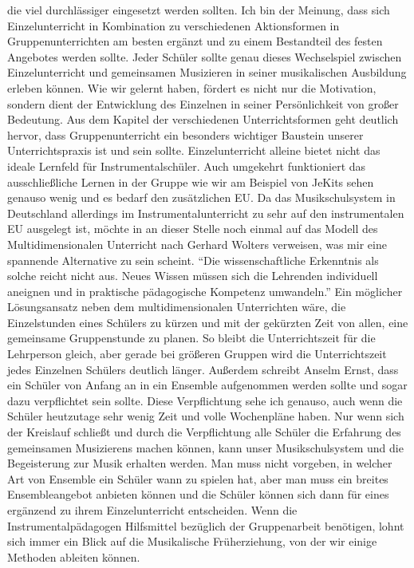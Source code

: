 die viel durchlässiger eingesetzt werden sollten. Ich bin der Meinung, dass sich
Einzelunterricht in Kombination zu verschiedenen Aktionsformen in
Gruppenunterrichten am besten ergänzt und zu einem Bestandteil des festen
Angebotes werden sollte. Jeder Schüler sollte genau dieses Wechselspiel zwischen
Einzelunterricht und gemeinsamen Musizieren in seiner musikalischen Ausbildung
erleben können. Wie wir gelernt haben, fördert es nicht nur die Motivation,
sondern dient der Entwicklung des Einzelnen in seiner Persönlichkeit von großer
Bedeutung. Aus dem Kapitel der verschiedenen Unterrichtsformen geht deutlich
hervor, dass Gruppenunterricht ein besonders wichtiger Baustein unserer
Unterrichtspraxis ist und sein sollte. Einzelunterricht alleine bietet nicht das
ideale Lernfeld für Instrumentalschüler. Auch umgekehrt funktioniert das
ausschließliche Lernen in der Gruppe wie wir am Beispiel von JeKits sehen
genauso wenig und es bedarf den zusätzlichen EU. Da das Musikschulsystem in
Deutschland allerdings im Instrumentalunterricht zu sehr auf den instrumentalen
EU ausgelegt ist, möchte in an dieser Stelle noch einmal auf das Modell des
Multidimensionalen Unterricht nach Gerhard Wolters verweisen, was mir eine
spannende Alternative zu sein scheint.
\enquote{Die wissenschaftliche Erkenntnis als solche reicht nicht aus. Neues
Wissen müssen sich die Lehrenden individuell aneignen und in praktische
pädagogische Kompetenz umwandeln.}
\autocite[10]{losert:die_kunst_zu_unterrichten} Ein möglicher Lösungsansatz
neben dem multidimensionalen Unterrichten wäre, die Einzelstunden eines Schülers
zu kürzen und mit der gekürzten Zeit von allen, eine gemeinsame Gruppenstunde zu
planen. So bleibt die Unterrichtszeit für die Lehrperson gleich, aber gerade bei
größeren Gruppen wird die Unterrichtszeit jedes Einzelnen Schülers deutlich
länger.\autocite[33]{losert:die_kunst_zu_unterrichten} Außerdem schreibt Anselm
Ernst, dass ein Schüler von Anfang an in ein Ensemble aufgenommen werden sollte
und sogar dazu verpflichtet sein sollte.
\autocite[61]{ernst:die_zukunftsfaehige_musikschule} Diese Verpflichtung sehe
ich genauso, auch wenn die Schüler heutzutage sehr wenig Zeit und volle
Wochenpläne haben. Nur wenn sich der Kreislauf schließt und durch die
Verpflichtung alle Schüler die Erfahrung des gemeinsamen Musizierens machen
können, kann unser Musikschulsystem und die Begeisterung zur Musik erhalten
werden. Man muss nicht vorgeben, in welcher Art von Ensemble ein Schüler wann zu
spielen hat, aber man muss ein breites Ensembleangebot anbieten können und die
Schüler können sich dann für eines ergänzend zu ihrem Einzelunterricht
entscheiden. Wenn die Instrumentalpädagogen Hilfsmittel bezüglich der
Gruppenarbeit benötigen, lohnt sich immer ein Blick auf die Musikalische
Früherziehung, von der wir einige Methoden ableiten können. 

